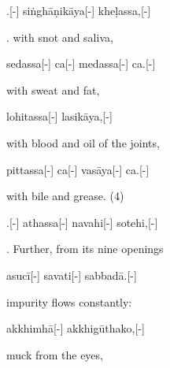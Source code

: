 \vskip 0.2in
\begin{samepage}
.[-] siṅghāṇikāya[-] kheḷassa,[-]
\endgl
\nopagebreak
\linespread{0.5}
\begin{spacin}{0.2}
{. with snot and saliva,}
\end{spacin}
\vskip 12pt
\end{samepage}
\begin{samepage}
\begingl[glneveryline={\PaliGlossA,\PaliGlossB}]
sedassa[-] ca[-] medassa[-] ca.[-]
\endgl
\nopagebreak
\linespread{0.5}
\begin{spacin}{0.2}
{\PaliGlossFT with sweat and fat,}
\end{spacin}
\vskip 12pt
\end{samepage}
\begin{samepage}
\begingl[glneveryline={\PaliGlossA,\PaliGlossB}]
lohitassa[-] lasikāya,[-]
\endgl
\nopagebreak
\linespread{0.5}
\begin{spacin}{0.2}
{\PaliGlossFT with blood and oil of the joints,}
\end{spacin}
\vskip 12pt
\end{samepage}
\begin{samepage}
\begingl[glneveryline={\PaliGlossA,\PaliGlossB}]
pittassa[-] ca[-] vasāya[-] ca.[-]
\endgl
\nopagebreak
\linespread{0.5}
\begin{spacin}{0.2}
{\PaliGlossFT with bile and grease. (4)}
\end{spacin}
\vskip 12pt
\end{samepage}
\vskip 0.2in
\begin{samepage}
.[-] athassa[-] navahi[-] sotehi,[-]
\endgl
\nopagebreak
\linespread{0.5}
\begin{spacin}{0.2}
{. Further, from its nine openings}
\end{spacin}
\vskip 12pt
\end{samepage}
\begin{samepage}
\begingl[glneveryline={\PaliGlossA,\PaliGlossB}]
asucī[-] savati[-] sabbadā.[-]
\endgl
\nopagebreak
\linespread{0.5}
\begin{spacin}{0.2}
{\PaliGlossFT impurity flows constantly:}
\end{spacin}
\vskip 12pt
\end{samepage}
\begin{samepage}
\begingl[glneveryline={\PaliGlossA,\PaliGlossB}]
akkhimhā[-] akkhigūthako,[-]
\endgl
\nopagebreak
\linespread{0.5}
\begin{spacin}{0.2}
{\PaliGlossFT muck from the eyes,}
\end{spacin}
\vskip 12pt
\end{samepage}
